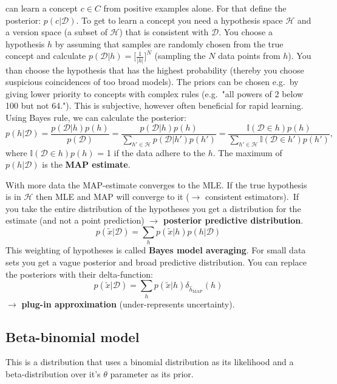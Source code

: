 \documentclass[
]{book}
\begin{document}
can learn a concept \(c \in C\) from positive examples alone. For that
define the posterior: \(p(c|\mathcal{D})\). To get to learn a concept you
need a hypothesis space \(\mathcal{H}\) and a version space (a subset of
\(\mathcal{H}\)) that is consistent with \(\mathcal{D}\). You choose a
hypothesis \(h\) by assuming that samples are randomly chosen from the
true concept and calculate
\(p(\mathcal{D}|h)=\lbrack \frac{1}{|h|}\rbrack^N\) (sampling the \(N\) data
points from \(h\)). You than choose the hypothesis that has the highest
probability (thereby you choose suspicious coincidences of too broad
models). The priors can be chosen e.g.~by giving lower priority to
concepts with complex rules (e.g.~"all powers of 2 below 100 but not
64."). This is subjective, however often beneficial for rapid
learning.\\
Using Bayes rule, we can calculate the posterior:
\[p(h|\mathcal{D}) =\dfrac{p(\mathcal{D}|h)p(h)}{p(\mathcal{D})} =  \dfrac{p(\mathcal{D}|h)p(h)}{\sum_{h' \in \mathcal{H}}p(\mathcal{D}|h')p(h')}=\dfrac{\mathbb{I}(\mathcal{D} \in h)p(h)}{\sum_{h' \in \mathcal{H}}\mathbb{I}(\mathcal{D} \in h')p(h')},\]
where \(\mathbb{I}(\mathcal{D} \in h)p(h)\) = 1 if the data adhere to the
\(h\). The maximum of \(p(h|\mathcal{D})\) is the \textbf{MAP estimate}.

With more data the MAP-estimate converges to the MLE. If the true
hypothesis is in \(\mathcal{H}\) then MLE and MAP will converge to it
(\(\rightarrow\) consistent estimators).~If you take the entire
distribution of the hypotheses you get a distribution for the estimate
(and not a point prediction) \(\rightarrow\) \textbf{posterior predictive
distribution}.
\[p(\tilde{x}|\mathcal{D}) = \sum_h p(\tilde{x}|h)p(h|\mathcal{D})\]
This weighting of hypotheses is called \textbf{Bayes model averaging}. For
small data sets you get a vague posterior and broad predictive
distribution. You can replace the posteriors with their delta-function:
\[p(\tilde{x}|\mathcal{D}) = \sum_h p(\tilde{x}|h)\delta_{\hat{h}_{\text{MAP}}}(h)\]
\(\rightarrow\) \textbf{plug-in approximation} (under-represents uncertainty).

\hypertarget{beta-binomial-model}{%
\subsection{Beta-binomial model}\label{beta-binomial-model}}

This is a distribution that uses a binomial distribution as its
likelihood and a beta-distribution over it's \(\theta\) parameter as its
prior.
\end{document}
